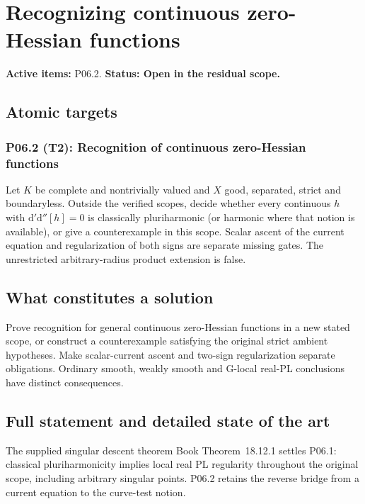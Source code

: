 \documentclass[11pt,a4paper]{article}
\theoremstyle{definition}
\theoremstyle{remark}
\newcommand{\rd}{\mathrm d}
\newcommand{\dprime}{\rd'}
\newcommand{\ddprime}{\rd''}
\newcommand{\dprimeddprime}{\dprime\ddprime}
\begin{document}
\clearpage\section{Recognizing continuous zero-Hessian functions}
\label{family:5}
\noindent\textbf{Active items:} P06.2. \textbf{Status: Open in the residual scope.}

\subsection{Atomic targets}
\subsubsection*{P06.2 (T2): Recognition of continuous zero-Hessian functions}
\label{atom:P06.2}
Let \(K\) be complete and nontrivially valued and \(X\) good, separated, strict and boundaryless. Outside the verified scopes, decide whether every continuous \(h\) with \(\dprimeddprime[h]=0\) is classically pluriharmonic (or harmonic where that notion is available), or give a counterexample in this scope. Scalar ascent of the current equation and regularization of both signs are separate missing gates. The unrestricted arbitrary-radius product extension is false.

\subsection{What constitutes a solution}
Prove recognition for general continuous zero-Hessian functions in a new stated scope, or construct a counterexample satisfying the original strict ambient hypotheses. Make scalar-current ascent and two-sign regularization separate obligations. Ordinary smooth, weakly smooth and G-local real-PL conclusions have distinct consequences.

\subsection{Full statement and detailed state of the art}
\label{sec:ch72-pluriharmonic}

The supplied singular descent theorem
Book Theorem~18.12.1 settles P06.1: classical
pluriharmonicity implies local real PL regularity throughout the original
scope, including arbitrary singular points. P06.2 retains the reverse
bridge from a current equation to the curve-test notion.
\end{document}
